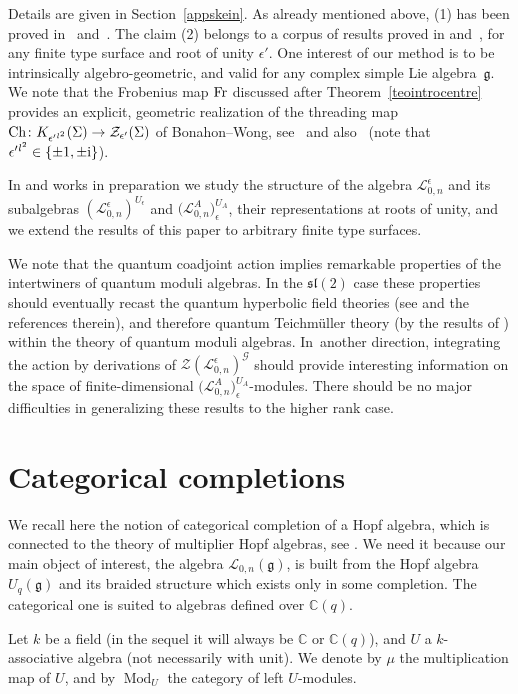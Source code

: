 \documentclass[pdftex]{sigma}%
\numberwithin{equation}{section}
\numberwithin{figure}{section}
\newcommand{\e}{\epsilon}
\newcommand{\mc}{\mathbb{C}}
\newcommand{\Ll}{{\mathcal L}}
\newcommand{\ra}{\rightarrow}
\begin{document}
Details are given in Section~\ref{appskein}. As already mentioned above, (1) has been proved in~\cite{BW0} and~\cite{PS}. The claim (2) belongs to a corpus of results proved in \cite{BW1,BW2} and~\cite{FKL,FKL2}, for any finite type surface and root of unity $\e'$. One interest of our method is to be intrinsically algebro-geometric, and valid for any complex simple Lie algebra~$\mathfrak{g}$. We note that the Frobenius map ${\rm Fr}$ discussed after Theorem~\ref{teointrocentre} provides an explicit, geometric realization of the threading map ${\rm Ch}\colon K_{\epsilon'{}^{l^2}}(\Sigma) \ra \mathcal{Z}_{\epsilon'}(\Sigma)$ of Bonahon--Wong, see~\cite{BW1} and also~\cite{FKL2} (note that $\epsilon'{}^{l^2}\in\{\pm 1, \pm {\rm i}\}$).

In \cite{BaRo2} and works in preparation we study the structure of the algebra $\Ll_{0,n}^\e$ and its subalgebras $(\Ll_{0,n}^\e)^{U_\e}$ and $\big(\Ll_{0,n}^A\big)^{U_A}_\e$, their representations at roots of unity, and we extend the results of this paper to arbitrary finite type surfaces.

We note that the quantum coadjoint action implies remarkable properties of the intertwiners of quantum moduli algebras. In the ${\mathfrak{sl}}(2)$ case these properties should eventually recast the quantum hyperbolic field theories (see \cite{BB1,BB2} and the references therein), and therefore quantum Teichm\"uller theory (by the results of \cite{BB3}) within the theory of quantum moduli algebras. In~another direction, integrating the action by derivations of $\mathcal{Z}(\Ll_{0,n}^\epsilon)^{\mathcal{G}}$ should provide inte\-res\-ting information on the space of finite-dimensional $\big(\Ll_{0,n}^A\big)^{U_A}_\e$-modules. There should be no major difficulties in generalizing these results to the higher rank case.

\section{Categorical completions}\label{CATCOMP}
We recall here the notion of categorical completion of a Hopf algebra, which is connected to the theory of multiplier Hopf algebras, see \cite{VD}. We need it because our main object of interest, the algebra $\Ll_{0,n}(\mathfrak{g})$, is built from the Hopf algebra $U_q(\mathfrak{g})$ and its braided structure which exists only in some completion. The categorical one is suited to algebras defined over $\mc(q)$.

Let $k$ be a field (in the sequel it will always be ${\mathbb C}$ or ${\mathbb C}(q)$), and $U$ a $k$-associative algebra (not necessarily with unit). We denote by $\mu$ the multiplication map of $U$, and by $\operatorname{Mod}_{U}$ the category of left $U$-modules.
\end{document}
